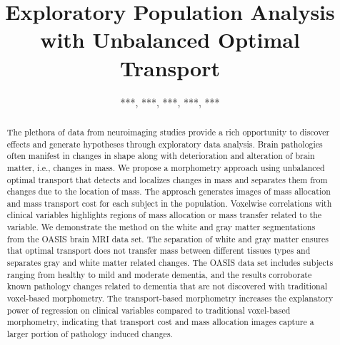 \documentclass{llncs}
\begin{document}
\title{Exploratory Population Analysis with Unbalanced Optimal Transport}

\author{***, ***, ***, ***, ***}%
\authorrunning{***}%
\institute{***\\%
\email{***@***.**}%
\and
***%
}

\maketitle              




\begin{abstract}
The plethora of data from neuroimaging studies provide a rich opportunity to
discover effects and generate hypotheses through exploratory data analysis.
Brain pathologies often manifest in changes in shape along with deterioration
and alteration of brain matter, i.e., changes in mass. We propose a morphometry
approach using unbalanced optimal transport that detects and localizes changes in
mass and separates them from changes due to the location of mass. The approach
generates images of mass allocation and mass transport cost for each subject in
the population. Voxelwise correlations with clinical variables highlights
regions of mass allocation or mass transfer related to the variable.  We
demonstrate the method on the white and gray matter segmentations
from the OASIS brain MRI data set.  The separation of white and gray matter
ensures that optimal transport does not transfer mass between different
tissues types and separates gray and white matter related changes. The OASIS
data set includes subjects ranging from healthy to mild and moderate dementia,
and the results corroborate known pathology changes related to dementia that
are not discovered with traditional voxel-based morphometry. The
transport-based morphometry increases the explanatory power of regression on
clinical variables compared to traditional voxel-based morphometry, indicating
that transport cost and mass allocation images capture a larger portion of
pathology induced changes.  
\end{abstract}
\end{document}
